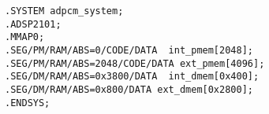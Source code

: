 \begin{verbatim}
.SYSTEM adpcm_system;
.ADSP2101;
.MMAP0;
.SEG/PM/RAM/ABS=0/CODE/DATA  int_pmem[2048];
.SEG/PM/RAM/ABS=2048/CODE/DATA ext_pmem[4096];
.SEG/DM/RAM/ABS=0x3800/DATA  int_dmem[0x400];
.SEG/DM/RAM/ABS=0x800/DATA ext_dmem[0x2800];
.ENDSYS;
\end{verbatim}
